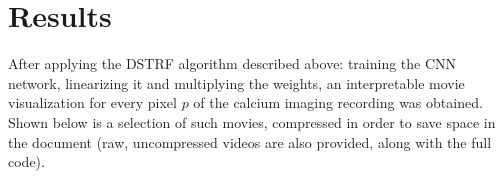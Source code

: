 \chapter{Results}\label{results}
After applying the DSTRF algorithm described above: training the CNN network, linearizing it and multiplying the weights, an interpretable movie visualization for every pixel $p$ of the calcium imaging recording was obtained. Shown below is a selection of such movies, compressed in order to save space in the document (raw, uncompressed videos are also provided, along with the full code).


